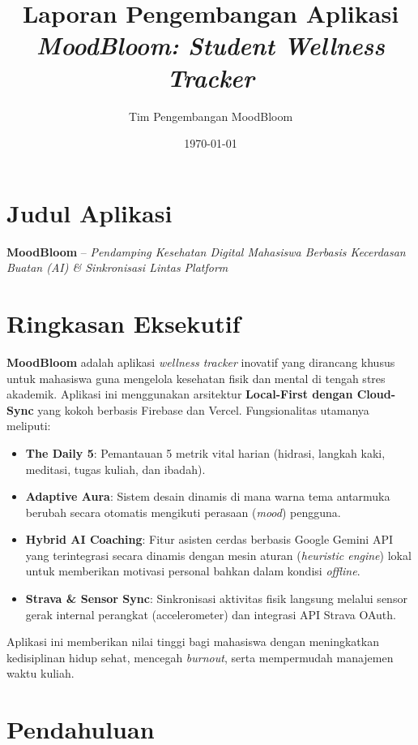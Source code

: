 \documentclass[12pt,a4paper]{article}
\title{
    \textbf{Laporan Pengembangan Aplikasi}\\
    \large \textit{MoodBloom: Student Wellness Tracker}
}
\author{Tim Pengembangan MoodBloom}
\date{\today}
\begin{document}
\maketitle
\tableofcontents
\newpage

\section{Judul Aplikasi}
\textbf{MoodBloom} -- \textit{Pendamping Kesehatan Digital Mahasiswa Berbasis Kecerdasan Buatan (AI) \& Sinkronisasi Lintas Platform}

\section{Ringkasan Eksekutif}
\textbf{MoodBloom} adalah aplikasi \textit{wellness tracker} inovatif yang dirancang khusus untuk mahasiswa guna mengelola kesehatan fisik dan mental di tengah stres akademik. Aplikasi ini menggunakan arsitektur \textbf{Local-First dengan Cloud-Sync} yang kokoh berbasis Firebase dan Vercel. Fungsionalitas utamanya meliputi:
\begin{itemize}
    \item \textbf{The Daily 5}: Pemantauan 5 metrik vital harian (hidrasi, langkah kaki, meditasi, tugas kuliah, dan ibadah).
    \item \textbf{Adaptive Aura}: Sistem desain dinamis di mana warna tema antarmuka berubah secara otomatis mengikuti perasaan (\textit{mood}) pengguna.
    \item \textbf{Hybrid AI Coaching}: Fitur asisten cerdas berbasis Google Gemini API yang terintegrasi secara dinamis dengan mesin aturan (\textit{heuristic engine}) lokal untuk memberikan motivasi personal bahkan dalam kondisi \textit{offline}.
    \item \textbf{Strava \& Sensor Sync}: Sinkronisasi aktivitas fisik langsung melalui sensor gerak internal perangkat (accelerometer) dan integrasi API Strava OAuth.
\end{itemize}
Aplikasi ini memberikan nilai tinggi bagi mahasiswa dengan meningkatkan kedisiplinan hidup sehat, mencegah \textit{burnout}, serta mempermudah manajemen waktu kuliah.

\section{Pendahuluan}
\end{document}
